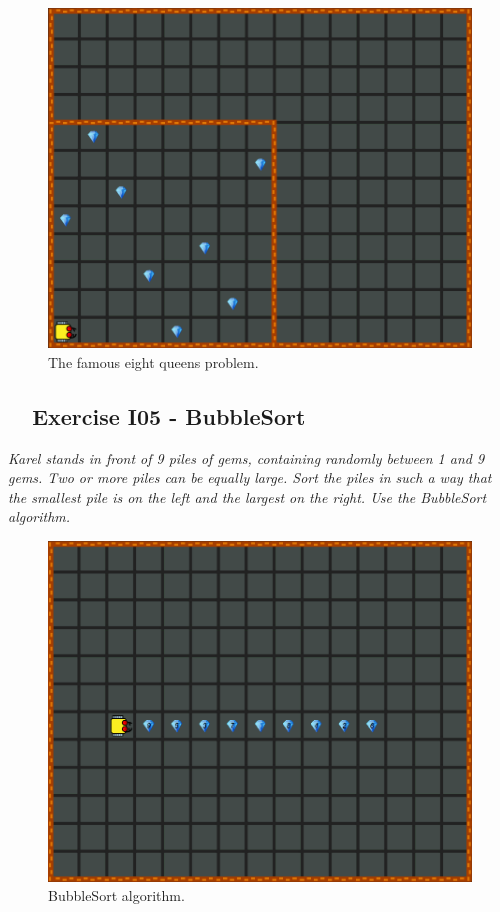 \documentclass[article,A4,12pt]{llncs}
\begin{document}
{{{{\newpage
\begin{figure}[!ht]
\begin{center}
\includegraphics[height=0.4\textwidth]{img/i04.png}
\end{center}
\vspace{-4mm}
\caption{The famous eight queens problem.}
\label{fig:g14}
\vspace{-4mm}
\end{figure}
\noindent

\subsection{\ \ Exercise I05 - BubbleSort}

{\em Karel stands in front of 9 piles of gems, containing randomly between 1 and 9 gems. Two or more piles can 
be equally large. Sort the piles in such a way that the smallest pile is on the left and the largest on the 
right. Use the BubbleSort algorithm.}

\begin{figure}[!ht]
\begin{center}
\includegraphics[height=0.4\textwidth]{img/i05.png}
\end{center}
\vspace{-4mm}
\caption{BubbleSort algorithm.}
\label{fig:g13}
\vspace{-4mm}
\end{figure}
\noindent








}}}}
\end{document}

